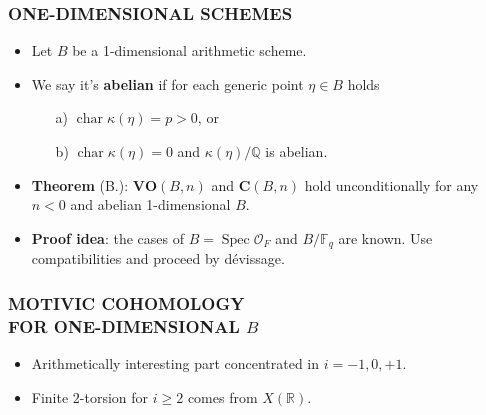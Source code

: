 \documentclass[handout]{beamer}
\newcommand{\FF}{\mathbb{F}}
\newcommand{\QQ}{\mathbb{Q}}
\newcommand{\RR}{\mathbb{R}}
\newcommand{\ZZ}{\mathbb{Z}}
\DeclareMathOperator{\fchar}{char}
\DeclareMathOperator{\Spec}{Spec}
\newcommand{\et}{\text{\it ét}}
\begin{document}
\begin{frame}
  \frametitle{ONE-DIMENSIONAL SCHEMES}

  \begin{itemize}
  \item<2-> Let $B$ be a 1-dimensional arithmetic scheme.

  \item<3-> We say it's \textbf{abelian} if for each generic point $\eta \in B$
    holds
    \begin{enumerate}
    \item[a)] $\fchar \kappa (\eta) = p > 0$, or

    \item[b)] $\fchar \kappa (\eta) = 0$ and $\kappa (\eta)/\QQ$ is abelian.
    \end{enumerate}

  \item<4-> \textbf{Theorem} (B.): $\mathbf{VO} (B,n)$ and $\mathbf{C} (B,n)$
    hold unconditionally for any $n < 0$ and abelian 1-dimensional $B$.

  \item<5-> \textbf{Proof idea}: the cases of $B = \Spec \mathcal{O}_F$ and
    $B/\FF_q$ are known. Use compatibilities and proceed by dévissage.
  \end{itemize}
\end{frame}


\begin{frame}
  \frametitle{MOTIVIC COHOMOLOGY\\
    FOR ONE-DIMENSIONAL $B$}

  \onslide<2->{\[ H^i (B_\et, \ZZ^c (n)) \cong
      \begin{cases}
        0, & i < -1, \\
        \text{f.g. of rk } d_n, & i = -1, \\
        \text{finite}, & i = 0,1, \\
        (\ZZ/2\ZZ)^{\oplus |X (\RR)|}, & i \ge 2, ~ i\not\equiv n ~ (2), \\
        0, & i \ge 2, ~ i\equiv n ~ (2).
      \end{cases} \]}

  \begin{itemize}
  \item<3-> Arithmetically interesting part concentrated in $i = -1,0,+1$.

  \item<4-> Finite $2$-torsion for $i \ge 2$ comes from $X (\RR)$.
  \end{itemize}
\end{frame}
\end{document}
